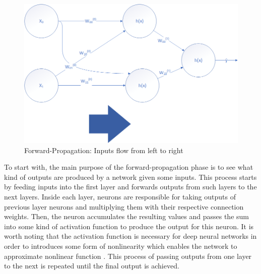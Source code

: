 \documentclass[conference]{IEEEtran}
\begin{document}
        \begin{figure}[!htb]
            \centering
            \captionsetup{justification=centering}
            \includegraphics[width=\linewidth]{ForwardProp.png}
            \caption{Forward-Propagation: Inputs flow from left to right}  
        \end{figure}

        To start with, the main purpose of the forward-propagation phase is to see what kind of outputs are produced by a network given some inputs. This process starts by feeding inputs into the first layer and forwards outputs from such layers to the next layers. Inside each layer, neurons are responsible for taking outputs of previous layer neurons and multiplying them with their respective connection weights. Then, the neuron accumulates the resulting values and passes the sum into some kind of activation function to produce the output for this neuron. It is worth noting that the activation function is necessary for deep neural networks in order to introduces some form of nonlinearity which enables the network to approximate nonlinear function \cite{luhaniwal_2020}. This process of passing outputs from one layer to the next is repeated until the final output is achieved.
\end{document}
